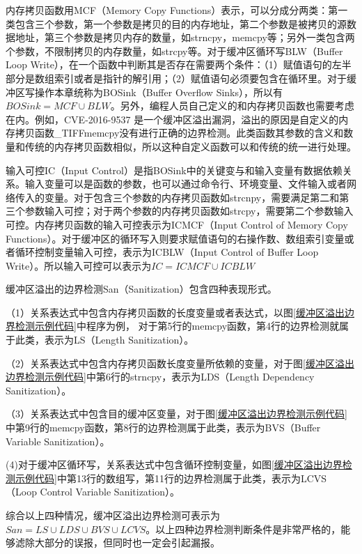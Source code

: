 {内存拷贝函数用MCF{（Memory Copy Functions）}表示，可以分成分两类：第一类包含三个参数，第一个参数是拷贝的目的内存地址，第二个参数是被拷贝的源数据地址，第三个参数是拷贝内存的数量，如strncpy，memcpy等；另外一类包含两个参数，不限制拷贝的内存数量，如strcpy等。对于缓冲区循环写BLW（Buffer Loop Write），在一个函数中判断其是否存在需要两个条件：（1）赋值语句的左半部分是数组索引或者是指针的解引用；（2）赋值语句必须要包含在循环里。对于缓冲区写操作本章统称为BOSink（Buffer Overflow Sinks），所以有$BOSink = MCF \cup BLW$。另外，编程人员自己定义的和内存拷贝函数也需要考虑在内。例如，CVE-2016-9537 是一个缓冲区溢出漏洞，溢出的原因是自定义的内存拷贝函数\_TIFFmemcpy没有进行正确的边界检测。此类函数其参数的含义和数量和传统的内存拷贝函数相似，所以这种自定义函数可以和传统的统一进行处理。

输入可控IC（Input Control）是指BOSink中的关键变与和输入变量有数据依赖关系。输入变量可以是函数的参数，也可以通过命令行、环境变量、文件输入或者网络传入的变量。对于包含三个参数的内存拷贝函数如strcnpy，需要满足第二和第三个参数输入可控；对于两个参数的内存拷贝函数如strcpy，需要第二个参数输入可控。内存拷贝函数的输入可控表示为ICMCF（Input Control of Memory Copy Functions）。对于缓冲区的循环写入则要求赋值语句的右操作数、数组索引变量或者循环控制变量输入可控，表示为ICBLW（Input Control of Buffer Loop Write）。所以输入可控可以表示为$IC = ICMCF \cup ICBLW$

缓冲区溢出的边界检测San（Sanitization）包含四种表现形式。

（1）关系表达式中包含内存拷贝函数的长度变量或者表达式，以图\ref{缓冲区溢出边界检测示例代码}中程序为例，
对于第5行的memcpy函数，第4行的边界检测就属于此类，表示为LS（Length Sanitization）。

{（2）}关系表达式中包含内存拷贝函数长度变量所依赖的变量，对于图\ref{缓冲区溢出边界检测示例代码}中第6行的strncpy，表示为LDS（Length Dependency Sanitization）。

（3）关系表达式中包含目的缓冲区变量，对于图\ref{缓冲区溢出边界检测示例代码}中第9行的memcpy函数，第8行的边界检测属于此类，表示为BVS（Buffer Variable Sanitization）。

(4)对于缓冲区循环写，关系表达式中包含循环控制变量，如图\ref{缓冲区溢出边界检测示例代码}中第13行的数组写，第11行的边界检测属于此类，表示为LCVS（Loop Control Variable Sanitization）。

综合以上四种情况，缓冲区溢出边界检测可表示为$San = LS \cup LDS \cup BVS \cup LCVS$。以上四种边界检测判断条件是非常严格的，能够滤除大部分的误报，但同时也一定会引起漏报。

}
